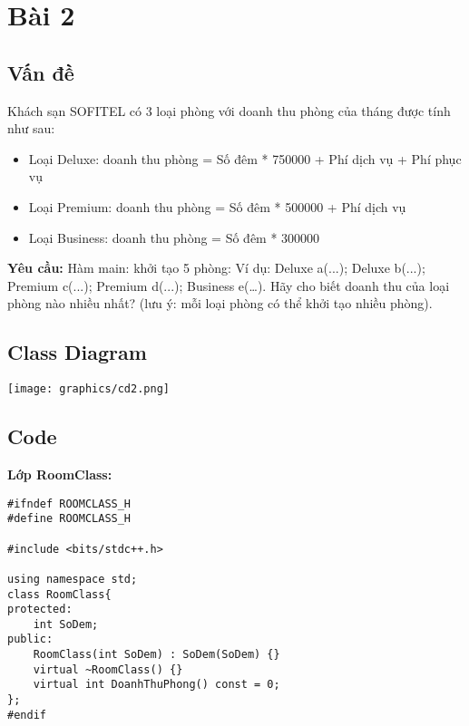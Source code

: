 \clearpage
\section{Bài 2}
\subsection{Vấn đề}
Khách sạn SOFITEL có 3 loại phòng với doanh thu phòng của tháng được tính như sau:
\begin{itemize}
    \item  Loại Deluxe: doanh thu phòng = Số đêm * 750000 + Phí dịch vụ + Phí phục vụ
    \item Loại Premium: doanh thu phòng = Số đêm * 500000 + Phí dịch vụ
    \item Loại Business: doanh thu phòng = Số đêm * 300000 
\end{itemize}

\textbf{Yêu cầu: } Hàm main: khởi tạo 5 phòng: Ví dụ: Deluxe a(...); Deluxe b(...); Premium
c(...); Premium d(...); Business e(…). Hãy cho biết doanh thu của loại phòng nào nhiều
nhất? (lưu ý: mỗi loại phòng có thể khởi tạo nhiều phòng).
\subsection{Class Diagram}
\texttt{[image: graphics/cd2.png]}
\subsection{Code}
\item {\textbf{Lớp RoomClass: }}
\begin{verbatim}
#ifndef ROOMCLASS_H
#define ROOMCLASS_H

#include <bits/stdc++.h> 

using namespace std;
class RoomClass{
protected:
    int SoDem;
public:
    RoomClass(int SoDem) : SoDem(SoDem) {}
    virtual ~RoomClass() {}
    virtual int DoanhThuPhong() const = 0;
};
#endif 
\end{verbatim}

